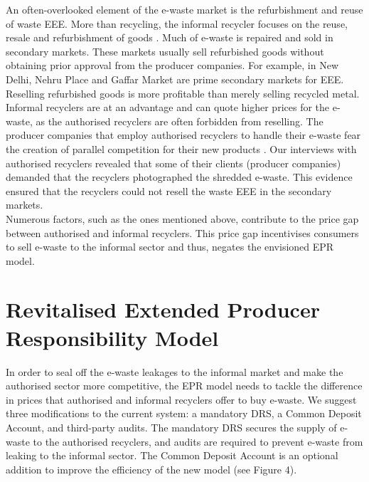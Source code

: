 \documentclass[a4paper, 12pt]{article}
\begin{document}
                    An often-overlooked element of the e-waste market is the refurbishment and reuse of waste EEE. More than recycling, the informal recycler focuses on the reuse, resale and refurbishment of goods \parencite{gidwanicorwinpaper}. Much of e-waste is repaired and sold in secondary markets. These markets usually sell refurbished goods without obtaining prior approval from the producer companies. For example, in New Delhi, Nehru Place and Gaffar Market are prime secondary markets for EEE.\\
                    
                    Reselling refurbished goods is more profitable than merely selling recycled metal. Informal recyclers are at an advantage and can quote higher prices for the e-waste, as the authorised recyclers are often forbidden from reselling. The producer companies that employ authorised recyclers to handle their e-waste fear the creation of parallel competition for their new products \parencite{alevphd}. Our interviews with authorised recyclers revealed that some of their clients (producer companies) demanded that the recyclers photographed the shredded e-waste. This evidence ensured that the recyclers could not resell the waste EEE in the secondary markets.\\
                    
                    Numerous factors, such as the ones mentioned above, contribute to the price gap between authorised and informal recyclers. This price gap incentivises consumers to sell e-waste to the informal sector and thus, negates the envisioned EPR model.
                    
                    
                    \section{Revitalised Extended Producer Responsibility Model}\label{sec:4}
                    
                    In order to seal off the e-waste leakages to the informal market and make the authorised sector more competitive, the EPR model needs to tackle the difference in prices that authorised and informal recyclers offer to buy e-waste. We suggest three modifications to the current system: a mandatory DRS, a Common Deposit Account, and third-party audits. The mandatory DRS secures the supply of e-waste to the authorised recyclers, and audits are required to prevent e-waste from leaking to the informal sector. The Common Deposit Account is an optional addition to improve the efficiency of the new model (see Figure 4). 
                    
\end{document}
